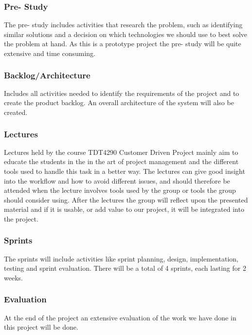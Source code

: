 \subsubsection{Pre- Study}
The pre- study includes activities that research the problem, such as identifying similar solutions and a decision on which technologies we should use to best solve the problem at hand. As this is a prototype project the pre- study will be quite extensive and time consuming.

\subsubsection{Backlog/Architecture}
Includes all activities needed to identify the requirements of the project and to create the product backlog. An overall architecture of the system will also be created.

\subsubsection{Lectures}
Lectures held by the course TDT4290 Customer Driven Project mainly aim to educate the students in the in the art of project management and the different tools used to handle this task in a better way. The lectures can give good insight into the workflow and how to avoid different issues, and should therefore be attended when the lecture involves tools used by the group or tools the group should consider using. After the lectures the group will reflect upon the presented material and if it is usable, or add value to our project, it will be integrated into the project.

\subsubsection{Sprints}
The sprints will include activities like sprint planning, design, implementation, testing and sprint evaluation. There will be a total of 4 sprints, each lasting for 2 weeks.

\subsubsection{Evaluation}
At the end of the project an extensive evaluation of the work we have done in this project will be done.

